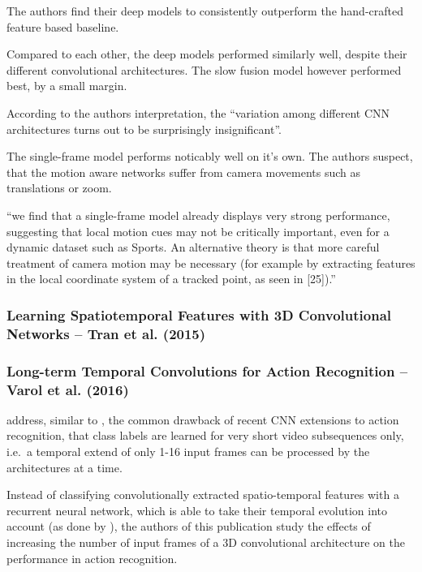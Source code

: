 The authors find their deep models to consistently outperform the hand-crafted feature based baseline.

Compared to each other, the deep models performed similarly well, despite their different convolutional architectures. The slow fusion model however performed best, by a small margin.

According to the authors interpretation, the ``variation among different CNN architectures turns out to be surprisingly insignificant''\cite{karpathy_large-scale_2014}.

The single-frame model performs noticably well on it's own. The authors suspect, that the motion aware networks suffer from camera movements such as translations or zoom.

``we find that a single-frame model already displays very strong performance, suggesting that local motion cues may not be critically important, even for a dynamic dataset such as Sports. An alternative theory is that more careful treatment of camera motion may be necessary (for example by extracting features in the local coordinate system of a tracked point, as seen in [25]).''

\subsubsection{Learning Spatiotemporal Features with 3D Convolutional Networks -- Tran et al. (2015)}

\subsubsection{Long-term Temporal Convolutions for Action Recognition -- Varol et al. (2016)}

\textcite{varol_long-term_2016} address, similar to \textcite{baccouche_sequential_2011}, the common drawback of recent CNN extensions to action recognition, that class labels are learned for very short video subsequences only, i.e.\ a temporal extend of only 1-16 input frames can be processed by the architectures at a time.\cite{ji_3d_2013}\cite{karpathy_large-scale_2014}\cite{tran_learning_2015}

Instead of classifying convolutionally extracted spatio-temporal features with a recurrent neural network, which is able to take their temporal evolution into account (as done by \textcite{baccouche_sequential_2011}), the authors of this publication study the effects of increasing the number of input frames of a 3D convolutional architecture on the performance in action recognition.

